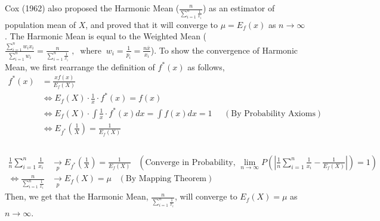 \documentclass{article}\usepackage[]{graphicx}\usepackage[]{color}
\numberwithin{figure}{subsection} %
\numberwithin{table}{subsection} %
\begin{document}
Cox (1962) also proposed the Harmonic Mean ($\frac{n}{\sum_{i=1}^{n}\frac{1}{{x}_{i}}}$) as an estimator of population mean of $X$, and proved that it will converge to $\mu={E}_{f}(x)$ as $n \to \infty$. The Harmonic Mean is equal to the Weighted Mean ($\frac{\sum_{i=1}^{n}{w}_{i}{x}_{i}}{\sum_{i=1}^{n}{w}_{i}}=\frac{n}{\sum_{i=1}^{n}\frac{1}{{x}_{i}}}\;,\;\;\text{where}\;\; {w}_{i}=\frac{1}{{p}_{i}}=\frac{n\bar{x}}{{x}_{i}}$). To show the convergence of Harmonic Mean, we first rearrange the definition of ${f}^{\ast}(x)$ as follows,
\begin{align*}
{f}^{\ast}(x)&=\frac{xf(x)}{{E}_{f}(X)}\\
& \Leftrightarrow {E}_{f}(X) \cdot \frac{1}{x} \cdot {f}^{\ast}(x) = f(x) \\
& \Leftrightarrow {E}_{f}(X) \cdot \int \frac{1}{x} \cdot {f}^{\ast}(x) dx = \int f(x) dx = 1 \;\;\;\;\; (\text{By Probability Axioms}) \\
& \Leftrightarrow {E}_{{f}^{\ast}}(\frac{1}{X}) = \frac{1}{{E}_{f}(X)}\\
\end{align*}
 \\
\begin{align*}
\frac{1}{n}\sum_{i=1}^{n}\frac{1}{{x}_{i}}  &\underset{p}{\longrightarrow} {E}_{{f}^{\ast}}(\frac{1}{X})=\frac{1}{{E}_{f}(X)} \; \; \; \left ( \text{Converge in Probability, } \lim_{n \to \infty } P \left(\left | \frac{1}{n}\sum_{i=1}^{n}\frac{1}{{x}_{i}} -  \frac{1}{{E}_{f}(X)} \right |\right)=1 \right ) \\
\Leftrightarrow \frac{n}{\sum_{i=1}^{n}\frac{1}{{x}_{i}}} &\underset{p}{\longrightarrow} {E}_{f}(X)=\mu \;\;\; \left(\text{By Mapping Theorem}\right)
\end{align*}
Then, we get that the Harmonic Mean, $\frac{n}{\sum_{i=1}^{n}\frac{1}{{x}_{i}}}$, will converge to ${E}_{f}(X)=\mu$ as $n \to \infty$. 
\end{document}
